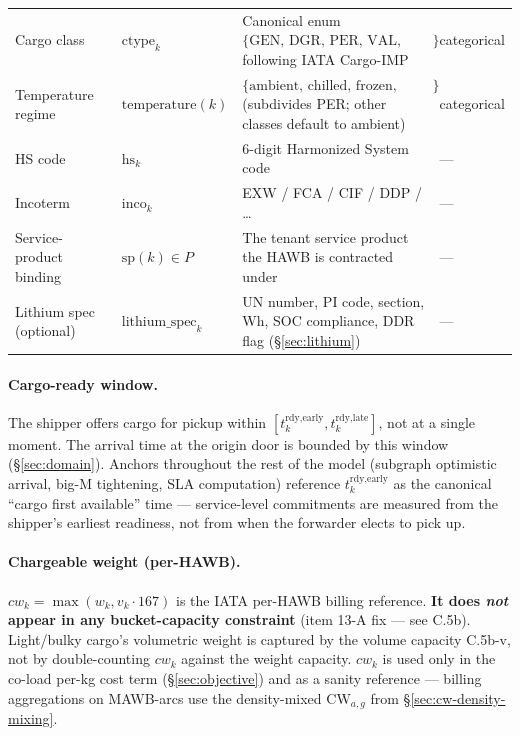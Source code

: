 \documentclass[11pt,a4paper]{article}
\newcommand{\ctype}{\text{ctype}}
\theoremstyle{definition}
\begin{document}
\begin{table}[H]
\begin{tabular}{p{3.5cm}p{2.2cm}p{6.5cm}p{1.5cm}}
Cargo class & $\ctype_k$ & Canonical enum $\{\text{GEN, DGR, PER, VAL, AVI, HUM}\}$ following IATA Cargo-IMP & categorical \\
Temperature regime & $\text{temperature}(k)$ & $\{\text{ambient, chilled, frozen, pharma}\}$ (subdivides PER; other classes default to ambient) & categorical \\
HS code & $\text{hs}_k$ & 6-digit Harmonized System code & --- \\
Incoterm & $\text{inco}_k$ & EXW / FCA / CIF / DDP / \ldots & --- \\
Service-product binding & $\text{sp}(k) \in P$ & The tenant service product the HAWB is contracted under & --- \\
Lithium spec (optional) & $\text{lithium\_spec}_k$ & UN number, PI code, section, Wh, SOC compliance, DDR flag (\S\ref{sec:lithium}) & --- \\
\bottomrule
\end{tabular}
\end{table}

\paragraph{Cargo-ready window.}
The shipper offers cargo for pickup within $[t_k^{\text{rdy,early}},
t_k^{\text{rdy,late}}]$, not at a single moment. The arrival time at the
origin door is bounded by this window (\S\ref{sec:domain}). Anchors throughout
the rest of the model (subgraph optimistic arrival, big-M tightening, SLA
computation) reference $t_k^{\text{rdy,early}}$ as the canonical ``cargo first
available'' time --- service-level commitments are measured from the shipper's
earliest readiness, not from when the forwarder elects to pick up.

\paragraph{Chargeable weight (per-HAWB).}
$cw_k = \max(w_k, v_k \cdot 167)$ is the IATA per-HAWB billing reference.
\textbf{It does \emph{not} appear in any bucket-capacity constraint} (item 13-A
fix --- see C.5b). Light/bulky cargo's volumetric weight is captured by the
volume capacity C.5b-v, not by double-counting $cw_k$ against the weight
capacity. $cw_k$ is used only in the co-load per-kg cost term (\S\ref{sec:objective})
and as a sanity reference --- billing aggregations on MAWB-arcs use the
density-mixed $\text{CW}_{a,g}$ from \S\ref{sec:cw-density-mixing}.
\end{document}
